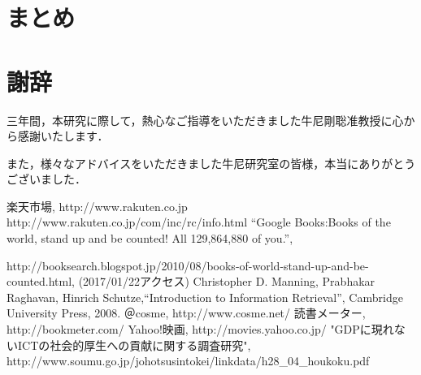 \documentclass[a4paper,11pt,oneside,openany]{jsbook}
\begin{document}
\chapter{まとめ}

\chapter*{謝辞}
三年間，本研究に際して，熱心なご指導をいただきました牛尼剛聡准教授に心から感謝いたします．
\par
また，様々なアドバイスをいただきました牛尼研究室の皆様，本当にありがとうございました．

\begin{thebibliography}{99}
	楽天市場, http://www.rakuten.co.jp
	http://www.rakuten.co.jp/com/inc/rc/info.html
	“Google Books:Books of the world, stand up and be counted! All 129,864,880 of you.”,
	\par
	http://booksearch.blogspot.jp/2010/08/books-of-world-stand-up-and-be-counted.html, (2017/01/22アクセス)
	Christopher D. Manning, Prabhakar Raghavan, Hinrich Schutze,“Introduction to Information Retrieval”, Cambridge University Press, 2008.
	＠cosme, http://www.cosme.net/
	読書メーター, http://bookmeter.com/
	Yahoo!映画, http://movies.yahoo.co.jp/
	"GDPに現れないICTの社会的厚生への貢献に関する調査研究", http://www.soumu.go.jp/johotsusintokei/linkdata/h28\_04\_houkoku.pdf
	

\end{thebibliography}
\end{document}
